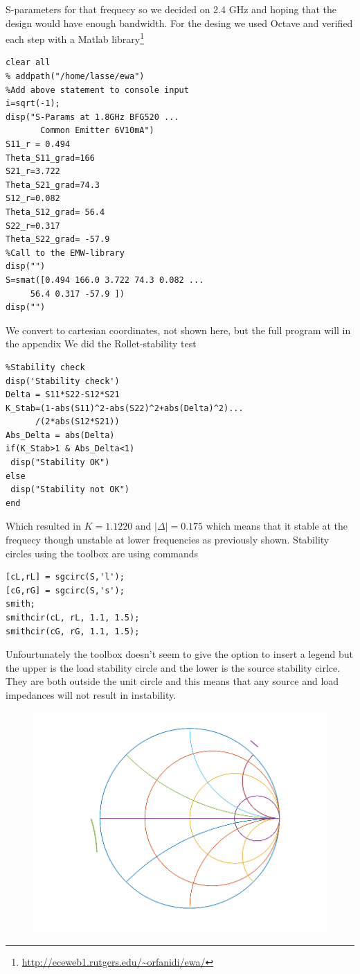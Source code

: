 \documentclass{article}
\begin{document}
\begin{multicols}{2}
S-parameters for that frequecy so we decided on 2.4 GHz and hoping that the
design would have enough bandwidth.
For the desing we used Octave and verified each step with a Matlab library\footnote{\url{http://eceweb1.rutgers.edu/~orfanidi/ewa/}}
\begin{verbatim}
clear all
% addpath("/home/lasse/ewa")
%Add above statement to console input
i=sqrt(-1);
disp("S-Params at 1.8GHz BFG520 ...
       Common Emitter 6V10mA")
S11_r = 0.494
Theta_S11_grad=166
S21_r=3.722
Theta_S21_grad=74.3
S12_r=0.082
Theta_S12_grad= 56.4
S22_r=0.317
Theta_S22_grad= -57.9
%Call to the EMW-library
disp("")
S=smat([0.494 166.0 3.722 74.3 0.082 ...
     56.4 0.317 -57.9 ])
disp("")
\end{verbatim}
We convert to cartesian coordinates, not shown here, but the full program will in the appendix
We did the Rollet-stability test
\begin{verbatim}
%Stability check
disp('Stability check')
Delta = S11*S22-S12*S21
K_Stab=(1-abs(S11)^2-abs(S22)^2+abs(Delta)^2)...
      /(2*abs(S12*S21))
Abs_Delta = abs(Delta)
if(K_Stab>1 & Abs_Delta<1)
 disp("Stability OK")
else
 disp("Stability not OK")
end
\end{verbatim}
Which resulted in $K = 1.1220$ and $|\Delta|= 0.175$ which means that it stable at the frequecy though unstable
at lower frequencies as previously shown.
Stability circles using the toolbox are
using commands
\begin{verbatim}
[cL,rL] = sgcirc(S,'l');
[cG,rG] = sgcirc(S,'s'); 
smith;
smithcir(cL, rL, 1.1, 1.5);
smithcir(cG, rG, 1.1, 1.5);
\end{verbatim}
Unfourtunately the toolbox doesn't seem to give the option to insert a legend but the upper is the load stability circle
and the lower is the source stability cirlce. They are both outside the unit circle and this means
that any source and load impedances will not result in instability.
\begin{figure}[H]
  \includegraphics[width=\linewidth]{stability.png}

\end{figure}
\end{multicols}
\end{document}
